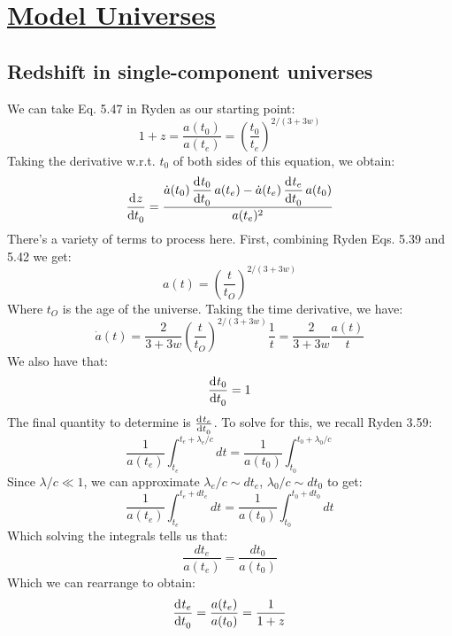 \section[Model Universes]{\hyperlink{toc}{Model Universes}}
\subsection{Redshift in single-component universes}
We can take Eq. 5.47 in Ryden as our starting point:
\begin{equation}\label{start51}
    1 + z = \frac{a(t_0)}{a(t_e)} = \left(\frac{t_0}{t_e}\right)^{2/(3 + 3w)}
\end{equation}
Taking the derivative w.r.t. $t_0$ of both sides of this equation, we obtain:
\begin{equation}\label{51temp1}
    \dod{z}{t_0} = \frac{\dot{a}(t_0)\dod{t_0}{t_0}a(t_e) - \dot{a}(t_e)\dod{t_e}{t_0}a(t_0)}{a(t_e)^2}
\end{equation}
There's a variety of terms to process here. First, combining Ryden Eqs. 5.39 and 5.42 we get:
\begin{equation}
    a(t) = \left(\frac{t}{t_O}\right)^{2/(3+3w)}
\end{equation}
Where $t_O$ is the age of the universe. Taking the time derivative, we have:
\begin{equation}\label{dota51}
    \dot{a}(t) = \frac{2}{3+3w}\left(\frac{t}{t_O}\right)^{2/(3+3w)}\frac{1}{t} = \frac{2}{3+3w}\frac{a(t)}{t}
\end{equation}
We also have that:
\begin{equation}\label{t051}
    \dod{t_0}{t_0} = 1
\end{equation}
The final quantity to determine is $\od{t_e}{t_0}$. To solve for this, we recall Ryden 3.59:
\begin{equation}
    \frac{1}{a(t_e)}\int_{t_e}^{t_e + \lambda_e/c}dt = \frac{1}{a(t_0)}\int_{t_0}^{t_0 + \lambda_0/c}
\end{equation}
Since $\lambda/c \ll 1$, we can approximate $\lambda_e/c \sim dt_e$, $\lambda_0/c \sim dt_0$ to get:
\begin{equation}
    \frac{1}{a(t_e)}\int_{t_e}^{t_e + dt_e} dt = \frac{1}{a(t_0)}\int_{t_0}^{t_0 + dt_0}dt
\end{equation}
Which solving the integrals tells us that:
\begin{equation}
    \frac{dt_e}{a(t_e)} = \frac{dt_0}{a(t_0)}
\end{equation}
Which we can rearrange to obtain:
\begin{equation}\label{te51}
    \dod{t_e}{t_0} = \frac{a(t_e)}{a(t_0)} = \frac{1}{1+z}
\end{equation}
